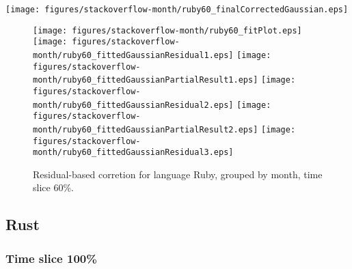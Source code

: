 \begin{center}
{\texttt{[image: figures/stackoverflow-month/ruby60\_finalCorrectedGaussian.eps]}}
\end{center}

\FloatBarrier

\begin{figure}[t]
\centering
{}
{\texttt{[image: figures/stackoverflow-month/ruby60\_fitPlot.eps]}}
{\texttt{[image: figures/stackoverflow-month/ruby60\_fittedGaussianResidual1.eps]}}
{\texttt{[image: figures/stackoverflow-month/ruby60\_fittedGaussianPartialResult1.eps]}}
{\texttt{[image: figures/stackoverflow-month/ruby60\_fittedGaussianResidual2.eps]}}
{\texttt{[image: figures/stackoverflow-month/ruby60\_fittedGaussianPartialResult2.eps]}}
{\texttt{[image: figures/stackoverflow-month/ruby60\_fittedGaussianResidual3.eps]}}
\caption{Residual-based corretion for language Ruby, grouped by month, time slice 60\%.}
\end{figure}


\FloatBarrier


\subsection{Rust}

\subsubsection{Time slice 100\%}

